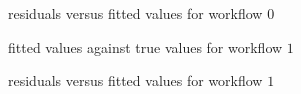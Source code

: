 \documentclass{article}
\begin{document}
\begin{figure}[!htbp]
\centering
{}
\caption{residuals versus fitted values for workflow $0$} \label{1d2_02}
\end{figure}

\begin{figure}[!htbp]
\centering
{}
\caption{fitted values against true values for workflow $1$} \label{1d2_11}
\end{figure}

\begin{figure}[!htbp]
\centering
{}
\caption{residuals versus fitted values for workflow $1$} \label{1d2_12}
\end{figure}
\end{document}

